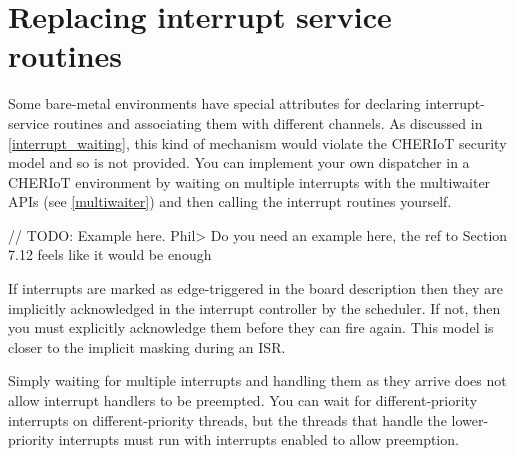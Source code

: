 \section{Replacing interrupt service routines}

Some bare-metal environments have special attributes for declaring interrupt-service routines and associating them with different channels.
As discussed in \ref{interrupt_waiting}, this kind of mechanism would violate the CHERIoT security model and so is not provided.
You can implement your own dispatcher in a CHERIoT environment by waiting on multiple interrupts with the multiwaiter APIs (see \ref{multiwaiter}) and then calling the interrupt routines yourself.

// TODO: Example here.
Phil> Do you need an example here, the ref to Section 7.12 feels like it would be enough

If interrupts are marked as edge-triggered in the board description then they are implicitly acknowledged in the interrupt controller by the scheduler.
If not, then you must explicitly acknowledge them before they can fire again.
This model is closer to the implicit masking during an ISR.

\begin{caution}
Simply waiting for multiple interrupts and handling them as they arrive does not allow interrupt handlers to be preempted.
You can wait for different-priority interrupts on different-priority threads, but the threads that handle the lower-priority interrupts must run with interrupts enabled to allow preemption.
\end{caution}